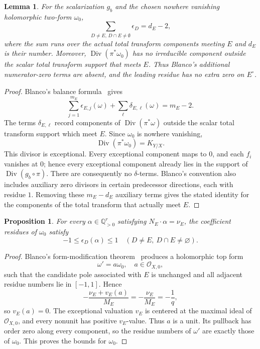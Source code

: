 \documentclass[12pt]{amsart}
\numberwithin{equation}{section}
\theoremstyle{plain}
\newtheorem{proposition}[theorem]{Proposition}
\newtheorem{lemma}[theorem]{Lemma}
\theoremstyle{definition}
\theoremstyle{remark}
\theoremstyle{definition}
\newcommand{\Q}{\mathbb Q}
\begin{document}
\begin{lemma}\label{lem:blanco-balance}
For the scalarization $g_b$ and the chosen nowhere vanishing holomorphic two-form $\omega_0$,
\begin{equation*}
\sum_{D\neq E,\, D\cap E\neq \emptyset}\epsilon_D=d_E-2,
\end{equation*}
where the sum runs over the actual total transform components meeting $E$ and $d_E$ is their number. Moreover, $\operatorname{Div}(\pi^*\omega_0)$ has no irreducible component outside the scalar total transform support that meets $E$. Thus Blanco's additional numerator-zero terms are absent, and the leading residue has no extra zero on $E^\circ$.
\end{lemma}

\begin{proof}
Blanco's balance formula~\cite[Lemma~4.1]{Blanco2026} gives
\begin{equation*}
\sum_{j=1}^{m_E}\epsilon_{E,j}(\omega)
 +
 \sum_{\ell}\delta_{E,\ell}(\omega)
 =
 m_E-2.
\end{equation*}
The terms $\delta_{E,\ell}$ record components of $\operatorname{Div}(\pi^*\omega)$ outside the scalar total transform support which meet $E$. Since $\omega_0$ is nowhere vanishing,
\begin{equation*}
\operatorname{Div}(\pi^*\omega_0)=K_{Y/X}.
\end{equation*}
This divisor is exceptional. Every exceptional component maps to $0$, and each $f_i$ vanishes at $0$; hence every exceptional component already lies in the support of $\operatorname{Div}(g_b\circ\pi)$. There are consequently no $\delta$-terms. Blanco's convention also includes auxiliary zero divisors in certain predecessor directions, each with residue $1$. Removing these $m_E-d_E$ auxiliary terms gives the stated identity for the components of the total transform that actually meet $E$.
\end{proof}

\begin{proposition}\label{prop:standard-residue-bounds}
For every $\alpha\in\Q_{>0}^r$ satisfying $N_E\cdot\alpha=\nu_E$, the coefficient residues of $\omega_0$ satisfy
\begin{equation*}
-1\leq\epsilon_D(\alpha)\leq1
 \quad(D\neq E,\ D\cap E\neq\varnothing).
\end{equation*}
\end{proposition}

\begin{proof}
Blanco's form-modification theorem~\cite[Theorem~A]{Blanco2026} produces a holomorphic top form
\[
\omega'=a\omega_0,\quad a\in\mathcal O_{X,0},
\]
such that the candidate pole associated with $E$ is unchanged and all adjacent residue numbers lie in $[-1,1]$. Hence
\[
    -\frac{\nu_E+v_E(a)}{M_E} = -\frac{\nu_E}{M_E} = -\frac1q,
\]
so $v_E(a)=0$. The exceptional valuation $v_E$ is centered at the maximal ideal of $\mathcal O_{X,0}$, and every nonunit has positive $v_E$-value. Thus $a$ is a unit. Its pullback has order zero along every component, so the residue numbers of $\omega'$ are exactly those of $\omega_0$. This proves the bounds for $\omega_0$.
\end{proof}
\end{document}
